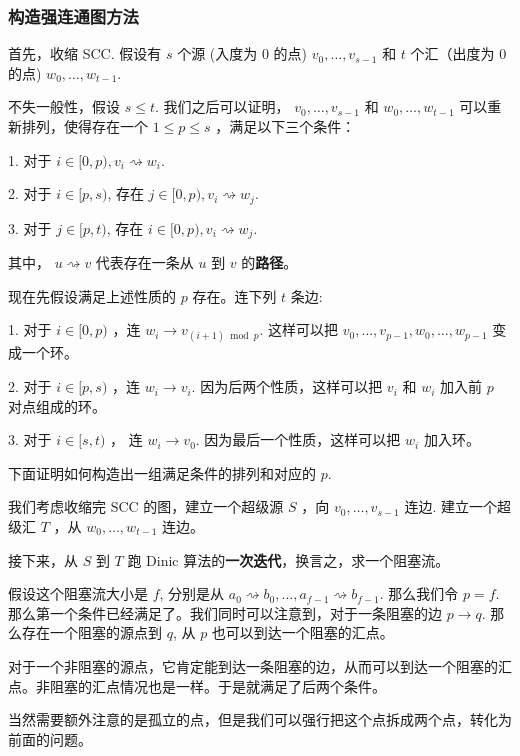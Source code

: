 \subsubsection{构造强连通图方法}

首先，收缩 SCC. 假设有 $s$ 个源 (入度为 $0$ 的点) $v_0, \ldots, v_{s-1}$ 和 $t$ 个汇（出度为 0 的点) $w_0, \ldots, w_{t-1}$.

不失一般性，假设 $s \leq t$. 我们之后可以证明， $v_0, \ldots, v_{s-1}$ 和 $w_0, \ldots, w_{t-1}$ 可以重新排列，使得存在一个 $1 \leq p \leq s$ ，满足以下三个条件：

1. 对于 $i \in[0, p), v_i \rightsquigarrow w_i$.

2. 对于 $i \in[p, s)$, 存在 $j \in[0, p), v_i \rightsquigarrow w_j$.

3. 对于 $j \in[p, t)$, 存在 $i \in[0, p), v_i \rightsquigarrow w_j$.

其中， $u \rightsquigarrow v$ 代表存在一条从 $u$ 到 $v$ 的\textbf{路径}。

现在先假设满足上述性质的 $p$ 存在。连下列 $t$ 条边:

1. 对于 $i \in[0, p)$ ，连 $w_i \rightarrow v_{(i+1) \bmod p}$. 这样可以把 $v_0, \ldots, v_{p-1}, w_0, \ldots, w_{p-1}$ 变成一个环。

2. 对于 $i \in[p, s)$ ，连 $w_i \rightarrow v_i$. 因为后两个性质，这样可以把 $v_i$ 和 $w_i$ 加入前 $p$ 对点组成的环。

3. 对于 $i \in[s, t)$ ， 连 $w_i \rightarrow v_0$. 因为最后一个性质，这样可以把 $w_i$ 加入环。

下面证明如何构造出一组满足条件的排列和对应的 $p$.

我们考虑收缩完 $\mathrm{SCC}$ 的图，建立一个超级源 $S$ ，向 $v_0, \ldots, v_{s-1}$ 连边. 建立一个超级汇 $T$ ，从 $w_0, \ldots, w_{t-1}$ 连边。

接下来，从 $S$ 到 $T$ 跑 Dinic 算法的\textbf{一次迭代}，换言之，求一个阻塞流。

假设这个阻塞流大小是 $f$, 分别是从 $a_0 \rightsquigarrow b_0, \ldots, a_{f-1} \rightsquigarrow b_{f-1}$. 那么我们令 $p=f$. 那么第一个条件已经满足了。我们同时可以注意到，对于一条阻塞的边 $p \rightarrow q$. 那么存在一个阻塞的源点到 $q$, 从 $p$ 也可以到达一个阻塞的汇点。

对于一个非阻塞的源点，它肯定能到达一条阻塞的边，从而可以到达一个阻塞的汇点。非阻塞的汇点情况也是一样。于是就满足了后两个条件。

当然需要额外注意的是孤立的点，但是我们可以强行把这个点拆成两个点，转化为前面的问题。

\newpage

